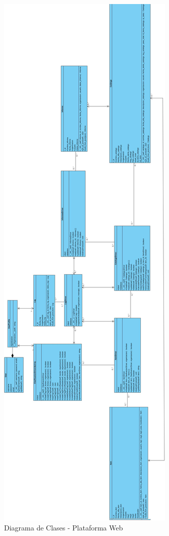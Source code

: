 \documentclass[a4paper,11pt]{book}
\begin{document}
\begin{figure}[H] 
\centering 
\includegraphics[scale=0.20]{imagenes/clases/NoInventory_clases_web.jpg}
\caption{ Diagrama de Clases - Plataforma Web\cite{diagrama}  }  
\end{figure}
\end{document}
